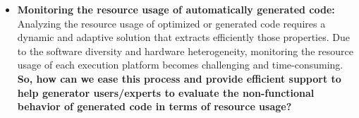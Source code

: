 \begin{itemize}
	\item \textbf{Monitoring the resource usage of automatically generated code:} 
	Analyzing the resource usage of optimized or generated code requires a dynamic and adaptive solution that extracts efficiently those properties. Due to the software diversity and hardware heterogeneity, monitoring the resource usage of each execution platform becomes challenging and time-consuming. 	
	\textbf{So, how can we ease this process and provide efficient support to help generator users/experts to evaluate the non-functional behavior of generated code in terms of resource usage?}
	

	

\end{itemize}


%
